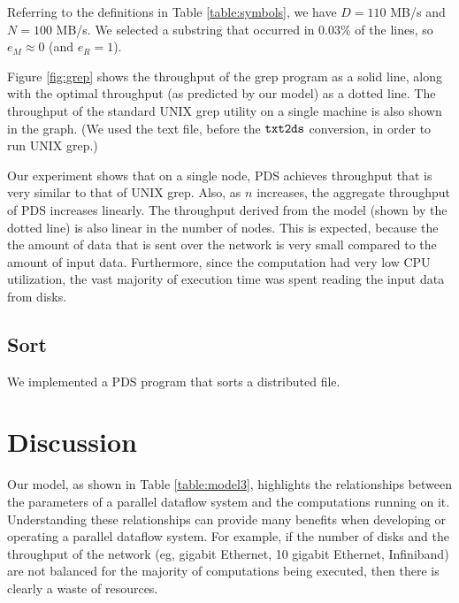 \documentclass{acm_proc_article-sp}
\begin{document}
Referring to the definitions in Table \ref{table:symbols}, we have $D = 110$ MB/s and $N = 100$ MB/s. We selected a substring that occurred in 0.03\% of the lines, so $e_M \approx 0$ (and $e_R = 1$).

Figure \ref{fig:grep} shows the throughput of the grep program as a solid line, along with the optimal throughput (as predicted by our model) as a dotted line. The throughput of the standard UNIX grep utility on a single machine is also shown in the graph. (We used the text file, before the $\tt txt2ds$ conversion, in order to run UNIX grep.)

Our experiment shows that on a single node, PDS achieves throughput that is very similar to that of UNIX grep. Also, as $n$ increases, the aggregate throughput of PDS increases linearly. The throughput derived from the model (shown by the dotted line) is also linear in the number of nodes. This is expected, because the the amount of data that is sent over the network is very small compared to the amount of input data. Furthermore, since the computation had very low CPU utilization, the vast majority of execution time was spent reading the input data from disks.


\subsection{Sort}

We implemented a PDS program that sorts a distributed file.  

\section{Discussion}

Our model, as shown in Table \ref{table:model3}, highlights the relationships between the parameters of a parallel dataflow system and the computations running on it. Understanding these relationships can provide many benefits when developing or operating a parallel dataflow system. For example, if the number of disks and the throughput of the network (eg, gigabit Ethernet, 10 gigabit Ethernet, Infiniband) are not balanced for the majority of computations being executed, then there is clearly a waste of resources.
\end{document}
